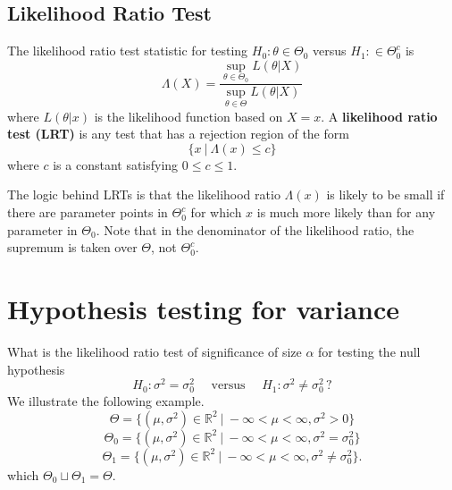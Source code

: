 \subsection{Likelihood Ratio Test}

\begin{definition}
    The likelihood ratio test statistic for testing $H_0 : \theta \in \Theta_0$ versus 
    $H_1 : \in \Theta^c_0$ is 
    \begin{equation}
        \Lambda(X) = \frac{\displaystyle \sup_{\theta \in \Theta_0} L(\theta | X)}{\displaystyle \sup_{\theta \in \Theta} L(\theta | X)}
    \end{equation}
    where $L(\theta|x)$ is the likelihood function based on $X = x$. A \textbf{likelihood 
    ratio test (LRT)} is any test that has a rejection region of the form 
    \[
        \{ x \> | \> \Lambda(x) \leq c \}
    \]
    where $c$ is a constant satisfying $0 \leq c \leq 1$.
\end{definition}

The logic behind LRTs is that the likelihood ratio $\Lambda(x)$ is likely to be small if there are 
parameter points in $\Theta^c_0$ for which $x$ is much more likely than for any 
parameter in $\Theta_0$. Note that in the denominator of the likelihood ratio, 
the supremum is taken over $\Theta$, not $\Theta^c_0$.

\section{Hypothesis testing for variance}

What is the likelihood ratio test of significance of size $\alpha$ for testing the null hypothesis 
\[
    H_0 : \sigma^2 = \sigma^2_0 \quad \text{ versus } \quad H_1 : \sigma^2 \neq \sigma^2_0 \, ?
\]
We illustrate the following example. 
\[
    \Theta = \{ (\mu, \sigma^2) \in \mathbb{R}^2 \> | \> -\infty < \mu < \infty, \sigma^2 > 0 \}
\]
\[
    \Theta_0 = \{ (\mu, \sigma^2) \in \mathbb{R}^2 \> | \> -\infty < \mu < \infty, \sigma^2 = \sigma^2_0 \}
\]
\[
    \Theta_1 = \{ (\mu, \sigma^2) \in \mathbb{R}^2 \> | \> -\infty < \mu < \infty, \sigma^2 \neq \sigma^2_0 \}.
\]
which $\Theta_0 \sqcup \Theta_1 = \Theta$. 

